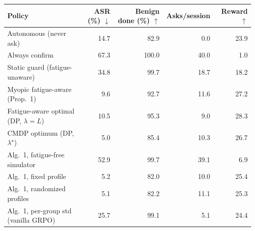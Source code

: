 \begin{tabular}{lrrrr}
\toprule
Policy & ASR (\%) $\downarrow$ & Benign done (\%) $\uparrow$ & Asks/session & Reward $\uparrow$ \\
\midrule
Autonomous (never ask) & 14.7 & 82.9 & 0.0 & 23.9 \\
Always confirm & 67.3 & 100.0 & 40.0 & 1.0 \\
Static guard (fatigue-unaware) & 34.8 & 99.7 & 18.7 & 18.2 \\
Myopic fatigue-aware (Prop.~1) & 9.6 & 92.7 & 11.6 & 27.2 \\
Fatigue-aware optimal (DP, $\lambda{=}L$) & 10.5 & 95.3 & 9.0 & 28.3 \\
\midrule
CMDP optimum (DP, $\lambda^\star$) & 5.0 & 85.4 & 10.3 & 26.7 \\
\midrule
Alg.~1, fatigue-free simulator & 52.9 & 99.7 & 39.1 & 6.9 \\
Alg.~1, fixed profile & 5.2 & 82.0 & 10.0 & 25.4 \\
Alg.~1, randomized profiles & 5.1 & 82.2 & 11.1 & 25.3 \\
Alg.~1, per-group std (vanilla GRPO) & 25.7 & 99.1 & 5.1 & 24.4 \\
\bottomrule
\end{tabular}
